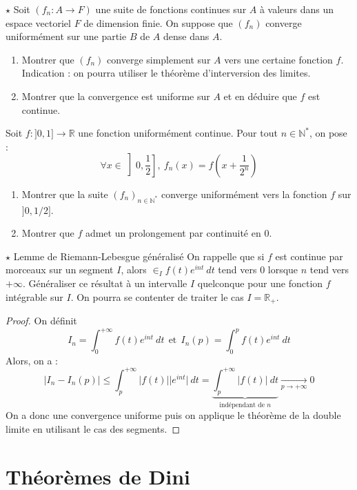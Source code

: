 \documentclass[french,a4paper]{article}
\newcommand{\N}{\mathbb{N}}
\newcommand{\R}{\mathbb{R}}
\newcommand{\st}{^*}
\theoremstyle{plain}
\theoremstyle{definition}
\theoremstyle{remark}
\begin{document}
\begin{ex}{$\star$}
	Soit $(f_n:A\to F)$ une suite de fonctions continues sur $A$ à valeurs dans un espace vectoriel $F$ de dimension finie. On suppose que $(f_n)$ converge uniformément sur une partie $B$ de $A$ dense dans $A$.
	\begin{enumerate}
		\item Montrer que $(f_n)$ converge simplement sur $A$ vers une certaine fonction $f$. Indication : on pourra utiliser le théorème d'interversion des limites.
		\item Montrer que la convergence est uniforme sur $A$ et en déduire que $f$ est continue.
	\end{enumerate}
\end{ex}

\begin{ex}{}
	Soit $f:]0,1]\to\R$ une fonction uniformément continue. Pour tout $n\in\N\st$, on pose : $$\forall x\in\left]0,\frac12\right],\ f_n(x)=f\left(x+\frac{1}{2^n}\right)$$
	\begin{enumerate}
		\item Montrer que la suite $(f_n)_{n\in\N\st}$ converge uniformément vers la fonction $f$ sur $\displaystyle]0,1/2]$.
		\item Montrer que $f$ admet un prolongement par continuité en $0$.
	\end{enumerate}
\end{ex}

\begin{ex}{$\star$ Lemme de Riemann-Lebesgue généralisé}
	On rappelle que si $f$ est continue par morceaux sur un segment $I$, alors $\displaystyle\in_If(t)e^{int}\ dt$ tend vers $0$ lorsque $n$ tend vers $+\infty$. Généraliser ce résultat à un intervalle $I$ quelconque pour une fonction $f$ intégrable sur $I$. On pourra se contenter de traiter le cas $I=\R_+$.
\end{ex}
\begin{proof}
	On définit $$I_n=\int_{0}^{+\infty}f(t)e^{int}\ dt \ \ \text{et} \ \ I_n(p)=\int_{0}^{p}f(t)e^{int}\ dt$$ Alors, on a : $$\lvert I_n-I_n(p)\rvert\leqslant\int_{p}^{+\infty}\lvert f(t)\rvert \lvert e^{int}\rvert\ dt=\underbrace{\int_{p}^{+\infty}\lvert f(t)\rvert \ dt}_{\text{indépendant de }n}\xrightarrow[p\to+\infty]{}0$$ On a donc une convergence uniforme puis on applique le théorème de la double limite en utilisant le cas des segments.
\end{proof}

\section{Théorèmes de Dini}
\end{document}
